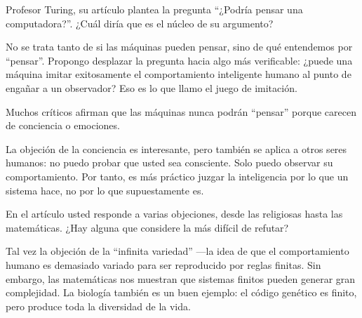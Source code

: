
\begin{description}[leftmargin=0cm, labelsep=0.5cm]

    \item[\textbf{Entrevistador:}] Profesor Turing, su artículo plantea la pregunta “¿Podría pensar una computadora?”. ¿Cuál diría que es el núcleo de su argumento?

    \item[\textbf{Turing:}] No se trata tanto de si las máquinas pueden pensar, sino de qué entendemos por “pensar”. Propongo desplazar la pregunta hacia algo más verificable: ¿puede una máquina imitar exitosamente el comportamiento inteligente humano al punto de engañar a un observador? Eso es lo que llamo el juego de imitación.

    \item[\textbf{Entrevistador:}] Muchos críticos afirman que las máquinas nunca podrán “pensar” porque carecen de conciencia o emociones.

    \item[\textbf{Turing:}] La objeción de la conciencia es interesante, pero también se aplica a otros seres humanos: no puedo probar que usted sea consciente. Solo puedo observar su comportamiento. Por tanto, es más práctico juzgar la inteligencia por lo que un sistema hace, no por lo que supuestamente es.

    \item[\textbf{Entrevistador:}] En el artículo usted responde a varias objeciones, desde las religiosas hasta las matemáticas. ¿Hay alguna que considere la más difícil de refutar?

    \item[\textbf{Turing:}] Tal vez la objeción de la “infinita variedad” —la idea de que el comportamiento humano es demasiado variado para ser reproducido por reglas finitas. Sin embargo, las matemáticas nos muestran que sistemas finitos pueden generar gran complejidad. La biología también es un buen ejemplo: el código genético es finito, pero produce toda la diversidad de la vida.


\end{description}

